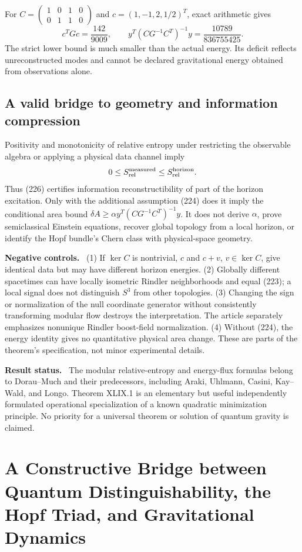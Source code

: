 \documentclass[11pt,a4paper,oneside]{book}
\newcommand{\note}[1]{\par\medskip\noindent\textbf{#1}\ }
\begin{document}
For $C=\left(\begin{smallmatrix}1&0&1&0\\0&1&1&0\end{smallmatrix}\right)$ and $c=(1,-1,2,1/2)^T$, exact arithmetic gives
\[c^TGc=\frac{142}{9009},\qquad y^T(CG^{-1}C^T)^{-1}y=\frac{10789}{836755425}.\]
The strict lower bound is much smaller than the actual energy. Its deficit reflects unreconstructed modes and cannot be declared gravitational energy obtained from observations alone.
\section{A valid bridge to geometry and information compression}
Positivity and monotonicity of relative entropy under restricting the observable algebra or applying a physical data channel imply
\[0\le S_{\rm rel}^{\rm measured}\le S_{\rm rel}^{\rm horizon}.\]
Thus (226) certifies information reconstructibility of part of the horizon excitation. Only with the additional assumption (224) does it imply the conditional area bound $\delta A\ge\alpha y^T(CG^{-1}C^T)^{-1}y$. It does not derive $\alpha$, prove semiclassical Einstein equations, recover global topology from a local horizon, or identify the Hopf bundle's Chern class with physical-space geometry.

\note{Negative controls.} (1) If $\ker C$ is nontrivial, $c$ and $c+v$, $v\in\ker C$, give identical data but may have different horizon energies. (2) Globally different spacetimes can have locally isometric Rindler neighborhoods and equal (223); a local signal does not distinguish $S^3$ from other topologies. (3) Changing the sign or normalization of the null coordinate generator without consistently transforming modular flow destroys the interpretation. The article separately emphasizes nonunique Rindler boost-field normalization. (4) Without (224), the energy identity gives no quantitative physical area change. These are parts of the theorem's specification, not minor experimental details.

\note{Result status.} The modular relative-entropy and energy-flux formulas belong to Dorau--Much and their predecessors, including Araki, Uhlmann, Casini, Kay--Wald, and Longo. Theorem XLIX.1 is an elementary but useful independently formulated operational specialization of a known quadratic minimization principle. No priority for a universal theorem or solution of quantum gravity is claimed.

\chapter{A Constructive Bridge between Quantum Distinguishability, the Hopf Triad, and Gravitational Dynamics}
\end{document}
